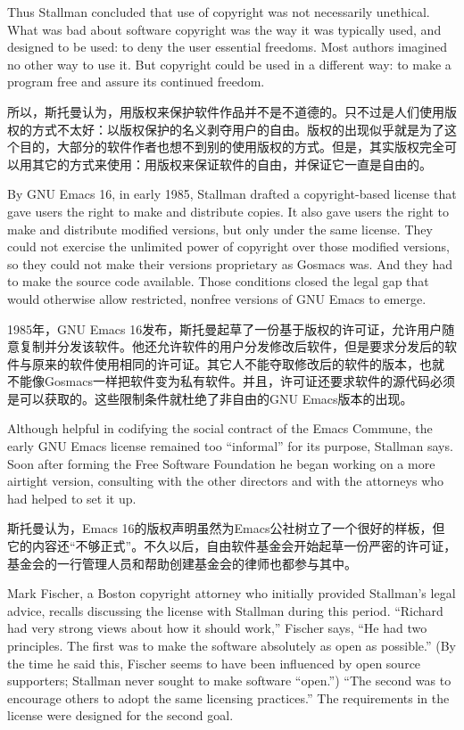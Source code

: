 \ifdefined\eng
Thus Stallman concluded that use of copyright was not necessarily unethical.  What was bad about software copyright was the way it was typically used, and designed to be used: to deny the user essential freedoms.  Most authors imagined no other way to use it.  But copyright could be used in a different way: to make a program free and assure its continued freedom.
\fi

\ifdefined\chs
所以，斯托曼认为，用版权来保护软件作品并不是不道德的。只不过是人们使用版权的方式不太好：以版权保护的名义剥夺用户的自由。版权的出现似乎就是为了这个目的，大部分的软件作者也想不到别的使用版权的方式。但是，其实版权完全可以用其它的方式来使用：用版权来保证软件的自由，并保证它一直是自由的。
\fi

\ifdefined\eng
By GNU Emacs 16, in early 1985, Stallman drafted a copyright-based license that gave users the right to make and distribute copies. It also gave users the right to make and distribute modified versions, but only under the same license.  They could not exercise the unlimited power of copyright over those modified versions, so they could not make their versions proprietary as Gosmacs was.  And they had to make the source code available.  Those conditions closed the legal gap that would otherwise allow restricted, nonfree versions of GNU Emacs to emerge.
\fi

\ifdefined\chs
1985年，GNU Emacs 16发布，斯托曼起草了一份基于版权的许可证，允许用户随意复制并分发该软件。他还允许软件的用户分发修改后软件，但是要求分发后的软件与原来的软件使用相同的许可证。其它人不能夺取修改后的软件的版本，也就 不能像Gosmacs一样把软件变为私有软件。并且，许可证还要求软件的源代码必须是可以获取的。这些限制条件就杜绝了非自由的GNU Emacs版本的出现。
\fi

\ifdefined\eng
Although helpful in codifying the social contract of the Emacs Commune, the early GNU Emacs license remained too ``informal'' for its purpose, Stallman says. Soon after forming the Free Software Foundation he began working on a more airtight version, consulting with the other directors and with the attorneys who had helped to set it up.
\fi

\ifdefined\chs
斯托曼认为，Emacs 16的版权声明虽然为Emacs公社树立了一个很好的样板，但它的内容还``不够正式''。不久以后，自由软件基金会开始起草一份严密的许可证，基金会的一行管理人员和帮助创建基金会的律师也都参与其中。
\fi

\ifdefined\eng
Mark Fischer, a Boston copyright attorney who initially provided Stallman's legal advice, recalls discussing the license with Stallman during this period. ``Richard had very strong views about how it should work,'' Fischer says, ``He had two principles. The first was to make the software absolutely as open as possible.'' (By the time he said this, Fischer seems to have been influenced by open source supporters; Stallman never sought to make software ``open.'') ``The second was to encourage others to adopt the same licensing practices.''  The requirements in the license were designed for the second goal.
\fi

